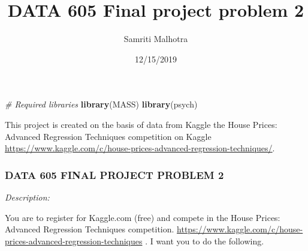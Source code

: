 \documentclass[]{article}
\title{DATA 605 Final project problem 2}
\author{Samriti Malhotra}
\date{12/15/2019}
\newenvironment{Shaded}{\begin{snugshade}}{\end{snugshade}}
\newcommand{\CommentTok}[1]{\textcolor[rgb]{0.56,0.35,0.01}{\textit{#1}}}
\newcommand{\KeywordTok}[1]{\textcolor[rgb]{0.13,0.29,0.53}{\textbf{#1}}}
\newcommand{\NormalTok}[1]{#1}
\begin{document}
\maketitle

{
\setcounter{tocdepth}{4}
\tableofcontents
}
\begin{Shaded}
\begin{Highlighting}[]
\CommentTok{# Required libraries}
\KeywordTok{library}\NormalTok{(MASS)}
\KeywordTok{library}\NormalTok{(psych)}
\end{Highlighting}
\end{Shaded}

This project is created on the basis of data from Kaggle the House
Prices: Advanced Regression Techniques competition on Kaggle
\url{https://www.kaggle.com/c/house-prices-advanced-regression-techniques/}.

\hypertarget{data-605-final-project-problem-2}{%
\subsubsection{DATA 605 FINAL PROJECT PROBLEM
2}\label{data-605-final-project-problem-2}}

\emph{Description:}

You are to register for Kaggle.com (free) and compete in the House
Prices: Advanced Regression Techniques competition.
\url{https://www.kaggle.com/c/house-prices-advanced-regression-techniques}
. I want you to do the following.
\end{document}
